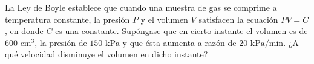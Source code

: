 \item La Ley de Boyle establece que cuando una muestra de gas se comprime a temperatura constante, la presión $P$ y el volumen $V$ satisfacen la ecuación $PV = C$, en donde $C$ es una constante. Supóngase que en cierto instante el volumen es de $600 \text{ cm}^3$, la presión de $150 \text{ kPa}$ y que ésta aumenta a razón de $20 \text{ kPa/min}$. ¿A qué velocidad disminuye el volumen en dicho instante?
